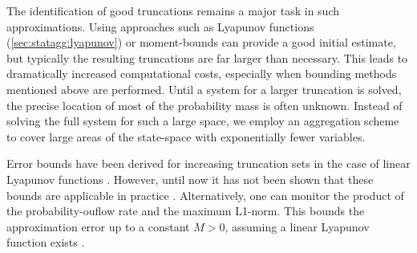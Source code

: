The identification of good truncations remains a major task in such approximations.
Using approaches such as Lyapunov functions (\autoref{sec:statagg:lyapunov}) \parencite{dayar2011bounding} or moment-bounds \parencite{kuntz2021approximations} can provide a good initial estimate, but typically the resulting truncations are far larger than necessary.
This leads to dramatically increased computational costs, especially when bounding methods mentioned above are performed.
Until a system for a larger truncation is solved, the precise location of  most of the probability mass is often unknown.
Instead of solving the full system for such a large space, we employ an aggregation scheme to cover large areas of the state-space with exponentially fewer variables.

Error bounds have been derived for increasing  truncation sets 
in the case of linear Lyapunov functions  \parencite{gupta2017finite}.
However, until now it has not been shown that these bounds are applicable in practice \parencite{meyn1994computable}.
Alternatively, one can monitor the product of the probability-ouflow rate and the maximum L1-norm.
This bounds the approximation error up to a constant $M>0$, assuming a linear Lyapunov function exists \parencite{gupta2017finite}.


